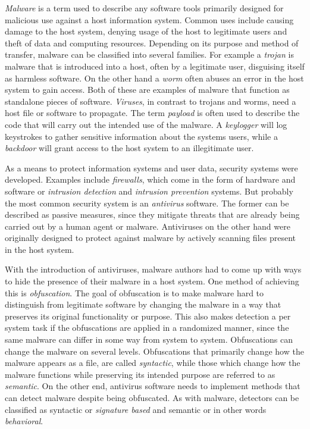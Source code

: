 \emph{Malware} is a term used to describe any software tools primarily designed for malicious use against a host information system. Common uses include causing damage to the host system, denying usage of the host to legitimate users and theft of data and computing resources. Depending on its purpose and method of transfer, malware can be classified into several families. For example a \emph{trojan} is malware that is introduced into a host, often by a legitimate user, disguising itself as harmless software. On the other hand a \emph{worm} often abuses an error in the host system to gain access. Both of these are examples of malware that function as standalone pieces of software. \emph{Viruses}, in contrast to trojans and worms, need a host file or software to propagate. The term \emph{payload} is often used to describe the code that will carry out the intended use of the malware. A \emph{keylogger} will log keystrokes to gather sensitive information about the systems users, while a \emph{backdoor} will grant access to the host system to an illegitimate user.


As a means to protect information systems and user data, security systems were developed. Examples include \emph{firewalls}, which come in the form of hardware and software or \emph{intrusion detection} and \emph{intrusion prevention} systems. But probably the most common security system is an \emph{antivirus} software. The former can be described as passive measures, since they mitigate threats that are already being carried out by a human agent or malware. Antiviruses on the other hand were originally designed to protect against malware by actively scanning files present in the host system.

With the introduction of antiviruses, malware authors had to come up with ways to hide the presence of their malware in a host system. One method of achieving this is \emph{obfuscation}. The goal of obfuscation is to make malware hard to distinguish from legitimate software by changing the malware in a way that preserves its original functionality or purpose. This also makes detection a per system task if the obfuscations are applied in a randomized manner, since the same malware can differ in some way from system to system. Obfuscations can change the malware on several levels. Obfuscations that primarily change how the malware appears as a file, are called \emph{syntactic}, while those which change how the malware functions while preserving its intended purpose are referred to as \emph{semantic}. On the other end, antivirus software needs to implement methods that can detect malware despite being obfuscated. As with malware, detectors can be classified as syntactic or \emph{signature based} and semantic or in other words \emph{behavioral}.

